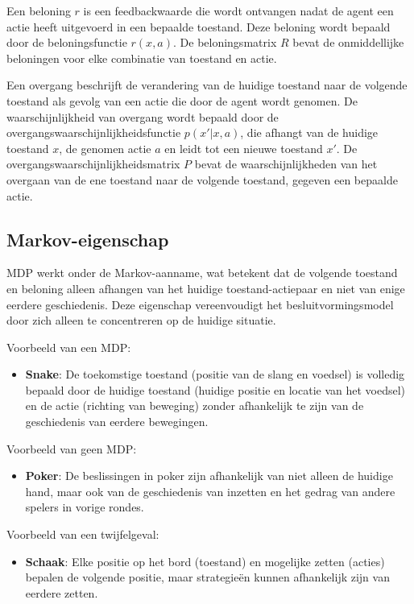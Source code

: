 \documentclass[a4paper,12pt]{report}
\begin{document}
Een beloning \( r \) is een feedbackwaarde die wordt ontvangen nadat de agent
een actie heeft uitgevoerd in een bepaalde toestand. Deze beloning wordt
bepaald door de beloningsfunctie \( r(x, a) \). De beloningsmatrix \( R \)
bevat de onmiddellijke beloningen voor elke combinatie van toestand en actie.

Een overgang beschrijft de verandering van de huidige toestand naar de volgende
toestand als gevolg van een actie die door de agent wordt genomen. De
waarschijnlijkheid van overgang wordt bepaald door de
overgangswaarschijnlijkheidsfunctie \( p(x'|x, a) \), die afhangt van de
huidige toestand \( x \), de genomen actie \( a \) en leidt tot een nieuwe
toestand \( x' \). De overgangswaarschijnlijkheidsmatrix \( P \) bevat de
waarschijnlijkheden van het overgaan van de ene toestand naar de volgende
toestand, gegeven een bepaalde actie.

\subsection*{Markov-eigenschap}

MDP werkt onder de Markov-aanname, wat betekent dat de volgende toestand en
beloning alleen afhangen van het huidige toestand-actiepaar en niet van enige
eerdere geschiedenis. Deze eigenschap vereenvoudigt het besluitvormingsmodel
door zich alleen te concentreren op de huidige situatie.

Voorbeeld van een MDP:
\begin{itemize}
    \item \textbf{Snake}: De toekomstige toestand (positie van de slang en voedsel) is volledig bepaald door de huidige toestand (huidige positie en locatie van het voedsel) en de actie (richting van beweging) zonder afhankelijk te zijn van de geschiedenis van eerdere bewegingen.
\end{itemize}

Voorbeeld van geen MDP:
\begin{itemize}
    \item \textbf{Poker}: De beslissingen in poker zijn afhankelijk van niet alleen de huidige hand, maar ook van de geschiedenis van inzetten en het gedrag van andere spelers in vorige rondes.
\end{itemize}

Voorbeeld van een twijfelgeval:
\begin{itemize}
    \item \textbf{Schaak}: Elke positie op het bord (toestand) en mogelijke zetten (acties) bepalen de volgende positie, maar strategieën kunnen afhankelijk zijn van eerdere zetten.
\end{itemize}
\end{document}
